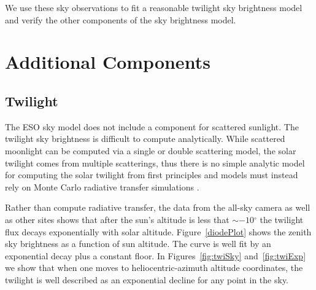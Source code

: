 \documentclass{emulateapj}  %
\newcommand\degree{{^\circ}}
\begin{document}
We use these sky observations to fit a reasonable twilight sky brightness model and verify the other components of the sky brightness model.

\section{Additional Components}
\subsection{Twilight}

The ESO sky model does not include a component for scattered sunlight.  The twilight sky brightness is difficult to compute analytically.  While scattered moonlight can be computed via a single or double scattering model, the solar twilight comes from multiple scatterings, thus there is no simple analytic model for computing the solar twilight from first principles and models must instead rely on Monte Carlo radiative transfer simulations \citep{Patat06}.

Rather than compute radiative transfer, the data from the all-sky camera as well as other sites shows that after the sun's altitude is less that $\sim-10\degree$ the twilight flux decays exponentially with solar altitude. Figure~\ref{diodePlot} shows the zenith sky brightness as a function of sun altitude. The curve is well fit by an exponential decay plus a constant floor.  In Figures~\ref{fig:twiSky} and~\ref{fig:twiExp} we show that when one moves to heliocentric-azimuth altitude coordinates, the twilight is well described as an exponential decline for any point in the sky.

\begin{figure*}
  \caption{The photodiode data.  All three photodiodes are pointed to zenith. The light gray points show individual measurements, while the yellow points are the median-binned data. The solid blue line shows the best fit exponential decay plus constant. The green vertical line marks 12 degree twilight, and the dashed vertical blue line shows where the data was not used because the detector was often saturated at that point. \label{diodePlot}}
\end{figure*}


\begin{figure*}
  \caption{Sky brightness values measured from the Canon all-sky camera after median binning spatially by Healpixels and combining similar sun altitudes. Only frames with the moon below the horizon were used. Zenith is at the center of each image, and the sun is below the horizon at an azimuth of zero (bottom of the frame. The data values are intrumental magnitudes.)  \label{fig:twiSky}}
\end{figure*}
\end{document}
